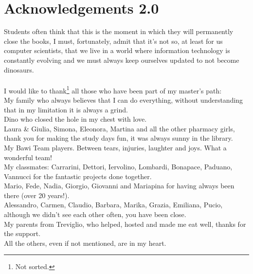\chapter*{Acknowledgements 2.0}

Students often think that this is the moment in which they will permanently close the books, I must, fortunately, admit that it's not so, at least for us computer scientists, that we live in a world where information technology is constantly evolving and we must always keep ourselves updated to not become dinosaurs.\\
\\
I would like to thank\footnote{Not sorted.} all those who have been part of my master's path:\\
My family who always believes that I can do everything, without understanding that in my limitation it is always a grind.\\
Dino who closed the hole in my chest with love.\\
Laura \& Giulia, Simona, Eleonora, Martina and all the other pharmacy girls, thank you for making the study days fun, it was always sunny in the library.\\
My Bawi Team players. Between tears, injuries, laughter and joys. What a wonderful team!\\
My classmates: Carrarini, Dettori, Iervolino, Lombardi, Bonapace, Paduano, Vannucci for the fantastic projects done together.\\
Mario, Fede, Nadia, Giorgio, Giovanni and Mariapina for having always been there (over 20 years!).\\
Alessandro, Carmen, Claudio, Barbara, Marika, Grazia, Emiliana, Pucio, although we didn't see each other often, you have been close.\\
My parents from Treviglio, who helped, hosted and made me eat well, thanks for the support.\\
All the others, even if not mentioned, are in my heart.